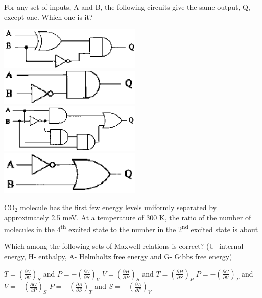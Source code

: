 \documentclass{exam}
\begin{document}
\begin{questions}
\question For any set of inputs, A and B, the following circuits give the same output, Q, except one. Which one is it?\hfill{}

\begin{oneparchoices}
	\choice \includegraphics[width=0.51\textwidth]{pics/41a.png}
	\choice \includegraphics[width=0.51\textwidth]{pics/41b.png}
	\choice \includegraphics[width=0.51\textwidth]{pics/41c.png}
	\choice \includegraphics[width=0.51\textwidth]{pics/41d.png}
\end{oneparchoices}

\question CO$_2$ molecule has the first few energy levels uniformly separated by approximately 2.5 meV. At a temperature of 300 K, the ratio of the number of molecules in the 4\textsuperscript{th} excited state to the number in the 2\textsuperscript{nd} excited state is about\hfill{}

\begin{oneparchoices}
	   
\end{oneparchoices}

\question Which among the following sets of Maxwell relations is correct? (U- internal energy, H- enthalpy, A- Helmholtz free energy and G- Gibbs free energy)\hfill{}

\begin{choices}
	\begin{multicols}{2}
	 \choice $T = \left(\frac{\partial U}{\partial V}\right)_{S}$ and $P = -\left(\frac{\partial U}{\partial S}\right)_{V}$
	\choice $V = \left(\frac{\partial H}{\partial P}\right)_{S}$ and $T = \left(\frac{\partial H}{\partial S}\right)_{P}$
	\choice $P = -\left(\frac{\partial G}{\partial V}\right)_{T}$ and $V = -\left(\frac{\partial G}{\partial P}\right)_{S}$
	\choice $P = -\left(\frac{\partial A}{\partial S}\right)_{T}$ and $S = -\left(\frac{\partial A}{\partial P}\right)_{V}$
	\end{multicols}
\end{choices}


\end{questions}
\end{document}
